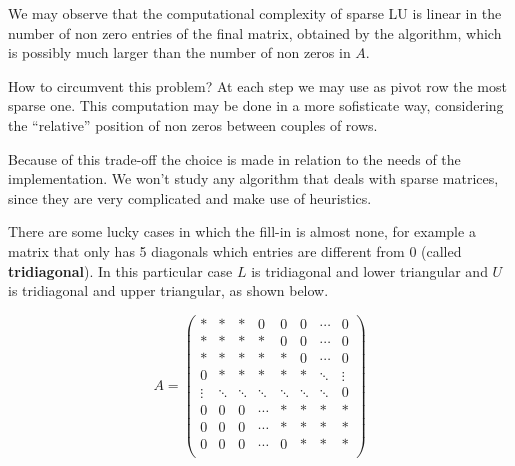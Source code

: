 \documentclass[ComputationalMathematics.tex]{subfiles}
\begin{document}
We may observe that the computational complexity of sparse LU is linear in the number of non zero entries of the final matrix, obtained by the algorithm, which is possibly much larger than the number of non zeros in $A$.

How to circumvent this problem? At each step we may use as pivot row the most sparse one. This computation may be done in a more sofisticate way, considering the ``relative'' position of non zeros between couples of rows.

Because of this trade-off the choice is made in relation to the needs of the implementation. We won't study any algorithm that deals with sparse matrices, since they are very complicated and make use of heuristics.

There are some lucky cases in which the fill-in is almost none, for example a matrix that only has 5 diagonals which entries are different from $0$ (called \textbf{tridiagonal}). In this particular case $L$ is tridiagonal and lower triangular and $U$ is tridiagonal and upper triangular, as shown below.

\[
A = \begin{pmatrix}
  \ast & \ast & \ast & 0 & 0 & 0  &\cdots & 0\\
  \ast & \ast & \ast & \ast & 0 & 0 & \cdots & 0\\
  \ast & \ast & \ast & \ast & \ast & 0 & \cdots & 0\\
  0 & \ast & \ast & \ast & \ast & \ast & \ddots & \vdots\\
  \vdots & \ddots & \ddots & \ddots & \ddots & \ddots & \ddots & 0\\
  0 & 0 & 0 & \cdots & \ast & \ast & \ast & \ast\\
  0 & 0 & 0 & \cdots & \ast & \ast & \ast & \ast\\
  0 & 0 & 0 & \cdots & 0 & \ast & \ast & \ast\\

\end{pmatrix}
\]
\end{document}
